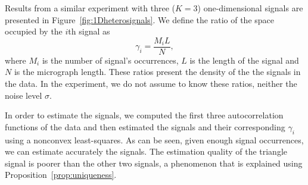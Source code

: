 \documentclass[english,11pt]{article}
\newcommand{\TODO}[1]{{\color{red}{[#1]}}}
\numberwithin{equation}{section}
\theoremstyle{plain}
\theoremstyle{definition}
\theoremstyle{remark}
\theoremstyle{plain}
\theoremstyle{remark}
\theoremstyle{plain}
\theoremstyle{plain}
\begin{document}
%


Results from a similar experiment with three ($K=3$) one-dimensional signals are presented in Figure~\ref{fig:1Dheterosignals}.
 We define the ratio of the space occupied by the $i$th signal as 
\begin{equation}
\gamma_i = \frac{M_i L}{N},
\end{equation}
where $M_i$ is the number of signal's  occurrences, $L$ is the length of the signal and $N$ is the micrograph length.
These ratios present the {density} of the the signals in the data.
In the experiment, we do not assume to know these ratios, neither the noise level $\sigma$. 

In order to estimate the signals, we computed the first three autocorrelation functions of the data and then estimated the signals and their corresponding $\gamma_i$ using a nonconvex least-squares. 
As can be seen, given enough signal occurrences, we can estimate accurately the signals. 
The estimation quality of the triangle signal is poorer than the other two signals, a phenomenon that is explained using Proposition~\ref{prop:uniqueness}.
\TODO{1. We will replace the figure with a ``progress figure'' (like we did for Einstien) for each signals and a plot of the recovery error for all three signals. 2. We may want to replace the triangle signal}
  
\end{document}
